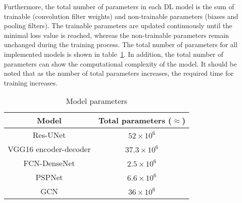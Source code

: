 
Furthermore, the total number of parameters in each DL model is the sum of trainable (convolution filter weights) and non-trainable parameters (biases and pooling filters).
The trainable parameters are updated continuously until the minimal loss value is reached, whereas the non-trainable parameters remain unchanged during the training process.
The total number of parameters for all implemented models is shown in table~\ref{tab:table_parameters}.
In addition, the total number of parameters can show the computational complexity of the model.
It should be noted that as the number of total parameters increases, the required time for training increases.
\begin{table}[]
	\centering
	\caption{Model parameters}
	\label{tab:table_parameters}
	\begin{tabular}{cc}\hline
		Model & Total parameters (\(\approx\)) \\ \hline
		Res-UNet & \(52\times 10^6\) \\ 
		VGG16 encoder-decoder & \(37.3\times 10^6\) \\
		FCN-DenseNet & \(2.5\times 10^6\) \\ 
		PSPNet & \(6.6\times 10^6\) \\ 
		GCN & \(36\times 10^6\) \\ \hline
	\end{tabular}
\end{table}
